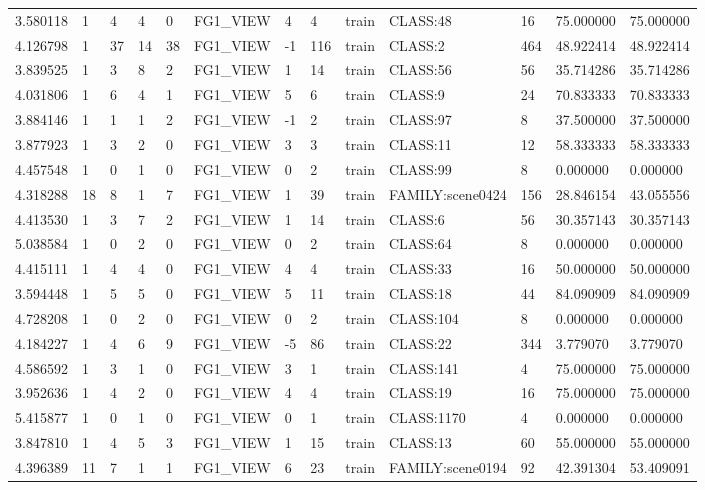 \begin{tabular}{lllllllllllll}
3.580118 & 1 & 4 & 4 & 0 & FG1\_VIEW & 4 & 4 & train & CLASS:48 & 16 & 75.000000 & 75.000000 \\
4.126798 & 1 & 37 & 14 & 38 & FG1\_VIEW & -1 & 116 & train & CLASS:2 & 464 & 48.922414 & 48.922414 \\
3.839525 & 1 & 3 & 8 & 2 & FG1\_VIEW & 1 & 14 & train & CLASS:56 & 56 & 35.714286 & 35.714286 \\
4.031806 & 1 & 6 & 4 & 1 & FG1\_VIEW & 5 & 6 & train & CLASS:9 & 24 & 70.833333 & 70.833333 \\
3.884146 & 1 & 1 & 1 & 2 & FG1\_VIEW & -1 & 2 & train & CLASS:97 & 8 & 37.500000 & 37.500000 \\
3.877923 & 1 & 3 & 2 & 0 & FG1\_VIEW & 3 & 3 & train & CLASS:11 & 12 & 58.333333 & 58.333333 \\
4.457548 & 1 & 0 & 1 & 0 & FG1\_VIEW & 0 & 2 & train & CLASS:99 & 8 & 0.000000 & 0.000000 \\
4.318288 & 18 & 8 & 1 & 7 & FG1\_VIEW & 1 & 39 & train & FAMILY:scene0424 & 156 & 28.846154 & 43.055556 \\
4.413530 & 1 & 3 & 7 & 2 & FG1\_VIEW & 1 & 14 & train & CLASS:6 & 56 & 30.357143 & 30.357143 \\
5.038584 & 1 & 0 & 2 & 0 & FG1\_VIEW & 0 & 2 & train & CLASS:64 & 8 & 0.000000 & 0.000000 \\
4.415111 & 1 & 4 & 4 & 0 & FG1\_VIEW & 4 & 4 & train & CLASS:33 & 16 & 50.000000 & 50.000000 \\
3.594448 & 1 & 5 & 5 & 0 & FG1\_VIEW & 5 & 11 & train & CLASS:18 & 44 & 84.090909 & 84.090909 \\
4.728208 & 1 & 0 & 2 & 0 & FG1\_VIEW & 0 & 2 & train & CLASS:104 & 8 & 0.000000 & 0.000000 \\
4.184227 & 1 & 4 & 6 & 9 & FG1\_VIEW & -5 & 86 & train & CLASS:22 & 344 & 3.779070 & 3.779070 \\
4.586592 & 1 & 3 & 1 & 0 & FG1\_VIEW & 3 & 1 & train & CLASS:141 & 4 & 75.000000 & 75.000000 \\
3.952636 & 1 & 4 & 2 & 0 & FG1\_VIEW & 4 & 4 & train & CLASS:19 & 16 & 75.000000 & 75.000000 \\
5.415877 & 1 & 0 & 1 & 0 & FG1\_VIEW & 0 & 1 & train & CLASS:1170 & 4 & 0.000000 & 0.000000 \\
3.847810 & 1 & 4 & 5 & 3 & FG1\_VIEW & 1 & 15 & train & CLASS:13 & 60 & 55.000000 & 55.000000 \\
4.396389 & 11 & 7 & 1 & 1 & FG1\_VIEW & 6 & 23 & train & FAMILY:scene0194 & 92 & 42.391304 & 53.409091 \\

\end{tabular}
